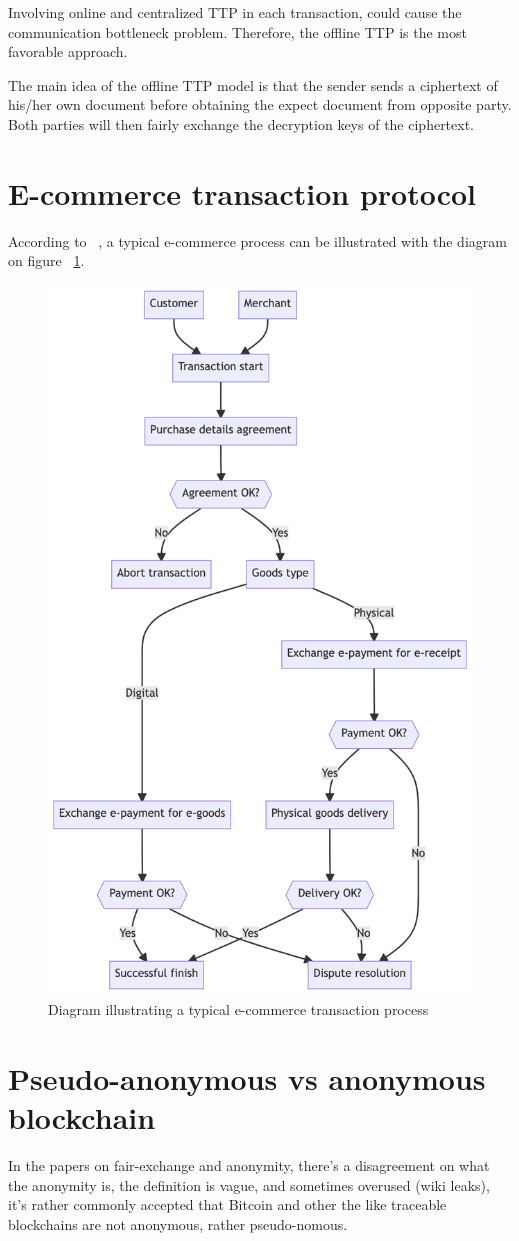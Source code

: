 \documentclass{article}
\begin{document}
Involving online and centralized TTP in each transaction, could cause the communication bottleneck problem. Therefore, the offline TTP is the most favorable approach.

The main idea of the offline TTP model is that the sender sends a ciphertext of his/her own document before obtaining the expect document from opposite party. Both parties will then fairly exchange the decryption keys of the ciphertext. 

\section{E-commerce transaction protocol}

According to ~\cite{djuric2015feips}, a typical e-commerce process can be illustrated with the diagram on figure ~\ref{fig:ecommerce-transaction-diagram}.

\begin{figure}[htbp]
\centerline{\includegraphics[width=.4\linewidth]{ecommerce-process.png}}
\caption{Diagram illustrating a typical e-commerce transaction process}
\label{fig:ecommerce-transaction-diagram}
\end{figure}

\section{Pseudo-anonymous vs anonymous blockchain}
In the papers on fair-exchange and anonymity, there's a disagreement on what the anonymity is, the definition is vague, and sometimes overused (wiki leaks), it's rather commonly accepted that Bitcoin and other the like traceable blockchains are not anonymous, rather pseudo-nomous. 
\end{document}
